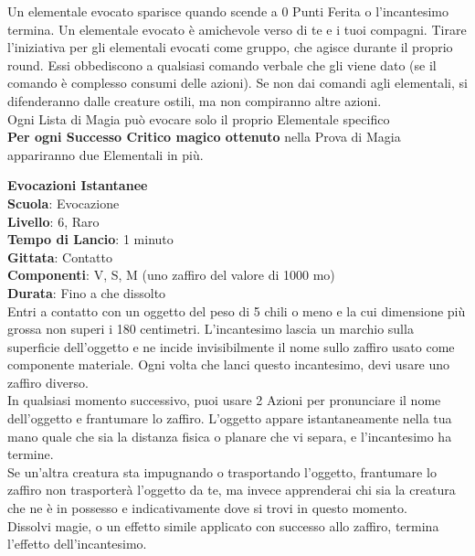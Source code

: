 \begin{multicols}{2}
\medskip
Un elementale evocato sparisce quando scende a 0 Punti Ferita o l'incantesimo termina. Un elementale evocato è amichevole verso di te e i tuoi compagni. Tirare l'iniziativa per gli elementali evocati come gruppo, che agisce durante il proprio round. Essi obbediscono a qualsiasi comando verbale che gli viene dato (se il comando è complesso consumi delle azioni). Se non dai comandi agli elementali, si difenderanno dalle creature ostili, ma non compiranno altre azioni.\\
Ogni Lista di Magia può evocare solo il proprio Elementale specifico\\
\textbf{Per ogni Successo Critico magico ottenuto} nella Prova di Magia appariranno due Elementali in più.

\medskip\textbf{Evocazioni Istantanee}\\
\textbf{Scuola}: Evocazione\\
\textbf{Livello}: 6, Raro\\
\textbf{Tempo di Lancio}: 1 minuto\\
\textbf{Gittata}: Contatto\\
\textbf{Componenti}: V, S, M (uno zaffiro del valore di 1000 mo)\\
\textbf{Durata}: Fino a che dissolto \\
Entri a contatto con un oggetto del peso di 5 chili o meno e la cui dimensione più grossa non superi i 180 centimetri. L'incantesimo lascia un marchio sulla superficie dell'oggetto e ne incide invisibilmente il nome sullo zaffiro usato come componente materiale. Ogni volta che lanci questo incantesimo, devi usare uno zaffiro diverso.\\
In qualsiasi momento successivo, puoi usare 2 Azioni per pronunciare il nome dell'oggetto e frantumare lo zaffiro. L'oggetto appare istantaneamente nella tua mano quale che sia la distanza fisica o planare che vi separa, e l'incantesimo ha termine.\\
Se un'altra creatura sta impugnando o trasportando l'oggetto, frantumare lo zaffiro non trasporterà l'oggetto da te, ma invece apprenderai chi sia la creatura che ne è in possesso e indicativamente dove si trovi in questo momento.\\
Dissolvi magie, o un effetto simile applicato con successo allo zaffiro, termina l'effetto dell'incantesimo.


\end{multicols}
